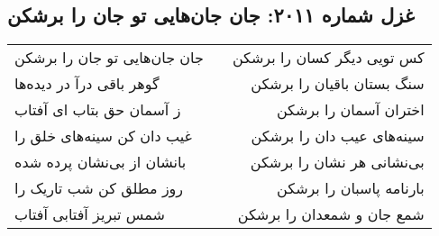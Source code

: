 \begin{center}
\section*{غزل شماره ۲۰۱۱: جان جان‌هایی تو جان را برشکن}
\label{sec:2011}
\begin{longtable}{l p{0.5cm} r}
جان جان‌هایی تو جان را برشکن
&&
کس تویی دیگر کسان را برشکن
\\
گوهر باقی درآ در دیده‌ها
&&
سنگ بستان باقیان را برشکن
\\
ز آسمان حق بتاب ای آفتاب
&&
اختران آسمان را برشکن
\\
غیب دان کن سینه‌های خلق را
&&
سینه‌های عیب دان را برشکن
\\
بانشان از بی‌نشان پرده شده
&&
بی‌نشانی هر نشان را برشکن
\\
روز مطلق کن شب تاریک را
&&
بارنامه پاسبان را برشکن
\\
شمس تبریز آفتابی آفتاب
&&
شمع جان و شمعدان را برشکن
\\
\end{longtable}
\end{center}
